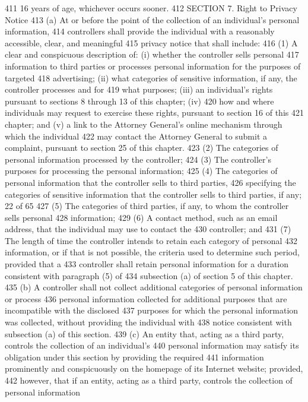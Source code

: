 411 16 years of age, whichever occurs sooner.
412 SECTION 7. Right to Privacy Notice
413 (a) At or before the point of the collection of an individual’s personal information,
414 controllers shall provide the individual with a reasonably accessible, clear, and meaningful
415 privacy notice that shall include:
416 (1) A clear and conspicuous description of: (i) whether the controller sells personal
417 information to third parties or processes personal information for the purposes of targeted
418 advertising; (ii) what categories of sensitive information, if any, the controller processes and for
419 what purposes; (iii) an individual’s rights pursuant to sections 8 through 13 of this chapter; (iv)
420 how and where individuals may request to exercise these rights, pursuant to section 16 of this
421 chapter; and (v) a link to the Attorney General’s online mechanism through which the individual
422 may contact the Attorney General to submit a complaint, pursuant to section 25 of this chapter.
423 (2) The categories of personal information processed by the controller;
424 (3) The controller’s purposes for processing the personal information;
425 (4) The categories of personal information that the controller sells to third parties,
426 specifying the categories of sensitive information that the controller sells to third parties, if any; 
22 of 65
427 (5) The categories of third parties, if any, to whom the controller sells personal
428 information;
429 (6) A contact method, such as an email address, that the individual may use to contact the
430 controller; and
431 (7) The length of time the controller intends to retain each category of personal
432 information, or if that is not possible, the criteria used to determine such period, provided that a
433 controller shall retain personal information for a duration consistent with paragraph (5) of
434 subsection (a) of section 5 of this chapter.
435 (b) A controller shall not collect additional categories of personal information or process
436 personal information collected for additional purposes that are incompatible with the disclosed
437 purposes for which the personal information was collected, without providing the individual with
438 notice consistent with subsection (a) of this section.
439 (c) An entity that, acting as a third party, controls the collection of an individual’s
440 personal information may satisfy its obligation under this section by providing the required
441 information prominently and conspicuously on the homepage of its Internet website; provided,
442 however, that if an entity, acting as a third party, controls the collection of personal information
